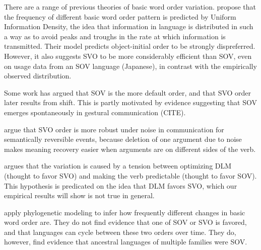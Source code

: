 \documentclass[11pt,a4paper]{article}
\begin{document}
There are a range of previous theories of basic word order variation.
\cite{maurits2010why} propose that the frequency of different basic word order pattern is predicted by Uniform Information Density, the idea that information in language is distributed in such a way as to avoid peaks and troughs in the rate at which information is transmitted.
Their model predicts object-initial order to be strongly dispreferred.
However, it also suggests SVO to be more considerably efficient than SOV, even on usage data from an SOV language (Japanese), in contrast with the empirically observed distribution.

Some work has argued that SOV is the more default order, and that SVO order later results from shift.
This is partly motivated by evidence suggesting that SOV emerges spontaneously in gestural communication (CITE).


\cite{gibson-noisy-channel-2013} argue that SVO order is more robust under noise in communication for semantically reversible events, because deletion of one argument due to noise makes meaning recovery easier when arguments are on different sides of the verb.

\cite{ferrer-i-cancho-placement-2017} argues that the variation is caused by a tension between optimizing DLM (thought to favor SVO) and making the verb predictable (thought to favor SOV). This hypothesis is predicated on the idea that DLM favors SVO, which our empirical results will show is not true in general.

\cite{maurits2014tracing} apply phylogenetic modeling to infer how frequently different changes in basic word order are.
They do not find evidence that one of SOV or SVO is favored, and that languages can cycle between these two orders over time.
They do, however, find evidence that ancestral languages of multiple families were SOV.
\end{document}
